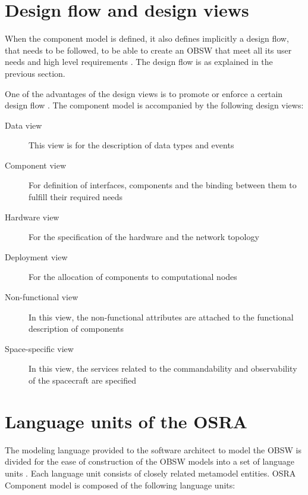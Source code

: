 \section{Design flow and design views}
\label{section: Design flow and views}
When the component model is defined, it also defines implicitly a design flow, that needs to be followed, to be able to create an OBSW that meet all its user needs and high level requirements \cite{SAVOIR, PhdThesis, CompBasedProcess}. The design flow is as explained in the previous section. 

One of the advantages of the design views is to promote or enforce a certain design flow \cite{CompBasedProcess}. The component model is accompanied by the following design views:
\begin{description}
\item [Data view] This view is for the description of data types and events
\item [Component view] For definition of interfaces, components and the binding between them to fulfill their required needs
\item [Hardware view] For the specification of the hardware and the network topology
\item [Deployment view] For the allocation of components to computational nodes
\item [Non-functional view] In this view, the non-functional attributes are attached to the functional description of components
\item [Space-specific view] In this view, the services related to the commandability and observability of the spacecraft are specified
\end{description}  

\section{Language units of the OSRA}
\label{Language units}
The modeling language provided to the software architect to model the OBSW is divided for the ease of construction of the OBSW models into a set of language units \cite{SpecMetamodel}. Each language unit consists of closely related metamodel entities. OSRA Component model is composed of the following language units:

